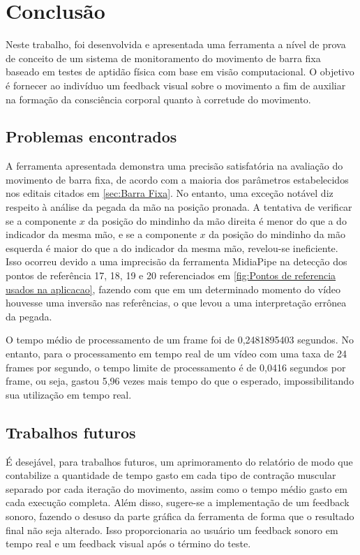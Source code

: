 \chapter{Conclusão}

Neste trabalho, foi desenvolvida e apresentada uma ferramenta a nível de prova de conceito de um sistema de monitoramento do movimento de barra fixa baseado em testes de aptidão física com base em visão computacional. O objetivo é fornecer ao indivíduo um feedback visual sobre o movimento a fim de auxiliar na formação da consciência corporal quanto à corretude do movimento.

\section[Problemas encontrados]{Problemas encontrados}\label{sec:Pontos fracos e possiveis melhorias}

A ferramenta apresentada demonstra uma precisão satisfatória na avaliação do movimento de barra fixa, de acordo com a maioria dos parâmetros estabelecidos nos editais citados em \ref{sec:Barra Fixa}. No entanto, uma exceção notável diz respeito à análise da pegada da mão na posição pronada. A tentativa de verificar se a componente $x$ da posição do mindinho da mão direita é menor do que a do indicador da mesma mão, e se a componente $x$ da posição do mindinho da mão esquerda é maior do que a do indicador da mesma mão, revelou-se ineficiente. Isso ocorreu devido a uma imprecisão da ferramenta MidiaPipe na detecção dos pontos de referência 17, 18, 19 e 20 referenciados em \ref{fig:Pontos de referencia usados na aplicacao}, fazendo com que em um determinado momento do vídeo houvesse uma inversão nas referências, o que levou a uma interpretação errônea da pegada.

O tempo médio de processamento de um frame foi de 0,2481895403 segundos. No entanto, para o processamento em tempo real de um vídeo com uma taxa de 24 frames por segundo, o tempo limite de processamento é de 0,0416 segundos por frame, ou seja, gastou 5,96 vezes mais tempo do que o esperado, impossibilitando sua utilização em tempo real.





\section[Trabalhos futuros]{Trabalhos futuros}
É desejável, para trabalhos futuros, um aprimoramento do relatório de modo que contabilize a quantidade de tempo gasto em cada tipo de contração muscular separado por cada iteração do movimento, assim como o tempo médio gasto em cada execução completa. Além disso, sugere-se a implementação de um feedback sonoro, fazendo o desuso da parte gráfica da ferramenta de forma que o resultado final não seja alterado. Isso proporcionaria ao usuário um feedback sonoro em tempo real e um feedback visual após o término do teste.

